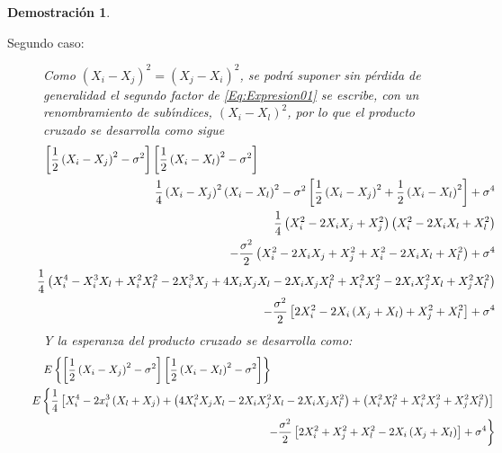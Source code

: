 \documentclass[a4paper,11pt]{article}
\theoremstyle{teoremas}
\theoremstyle{ejemplos}
\theoremstyle{definiciones}
\theoremstyle{lemas}
\newtheorem*{demostracion}{Demostraci\'on}
\begin{document}
\begin{demostracion}
\begin{description}
  \item[Segundo caso:] Como $\left( X_i - X_j \right)^2 = \left( X_j - X_i \right)^2$, se podr\'a suponer sin p\'erdida de generalidad el segundo factor de \ref{Eq:Expresion01} se escribe, con un renombramiento de sub\'{\i}ndices, $\left( X_i - X_l \right)^2$, por lo que el producto cruzado se desarrolla como sigue
  \begin{eqnarray*}
   \left[ \frac{1}{2}\left( X_i - X_j \right)^2 - \sigma^2 \right] \left[ \frac{1}{2}\left( X_i - X_l \right)^2 - \sigma^2 \right] \\
    & \hspace{-14cm} = & \hspace{-7cm} \frac{1}{4}\left( X_i - X_j \right)^2\left( X_i - X_l \right)^2 - \sigma^2\left[ \frac{1}{2}\left( X_i -X_j \right)^2 + \frac{1}{2}\left( X_i - X_l \right)^2 \right] + \sigma^4 \\ 
    & \hspace{-14cm} = & \hspace{-7cm} \frac{1}{4}\left( X_i^2 - 2X_iX_j + X_j^2 \right)\left( X_i^2 - 2X_iX_l + X_l^2 \right) \\
    & & \hspace{-7cm} - \frac{\sigma^2}{2}\left( X_i^2 -2X_iX_j + X_j^2 + X_i^2 - 2X_iX_l + X_l^2 \right) + \sigma^4 \\
    & \hspace{-14cm} = & \hspace{-7cm} \frac{1}{4}\left( X_i^4 - X_i^3X_l + X_i^2X_l^2 - 2X_i^3X_j + 4X_iX_jX_l - 2X_iX_jX_l^2 + X_i^2X_j^2 - 2X_iX_j^2X_l + X_j^2X_l^2 \right) \\
    & & \hspace{-7cm} - \frac{\sigma^2}{2}\left[ 2X_i^2 - 2X_i\left( X_j + X_l \right) + X_j^2 + X_l^2 \right] + \sigma^4
  \end{eqnarray*}
  Y la esperanza del producto cruzado se desarrolla como:
  \begin{eqnarray*}
   E\left\{ \left[ \frac{1}{2}\left( X_i - X_j \right)^2 - \sigma^2 \right] \left[ \frac{1}{2}\left( X_i - X_l \right)^2 - \sigma^2 \right] \right\} \\
     & \hspace{-16cm} = & \hspace{-8cm} E\left\{ \frac{1}{4}\left[ X_i^4 - 2x_i^3\left( X_l + X_j \right) + \left( 4X_i^2X_jX_l - 2X_iX_j^2X_l - 2X_iX_jX_l^2 \right) + \left( X_i^2X_l^2 + X_i^2X_j^2 + X_j^2X_l^2 \right) \right] \right. \\ 
     & & \hspace{-8cm} \left. - \frac{\sigma^2}{2}\left[ 2X_i^2 + X_j^2 + X_l^2 - 2X_i\left( X_j + X_l \right) \right] + \sigma^4 \right\} \\

\end{eqnarray*}
\end{description}
\end{demostracion}
\end{document}
